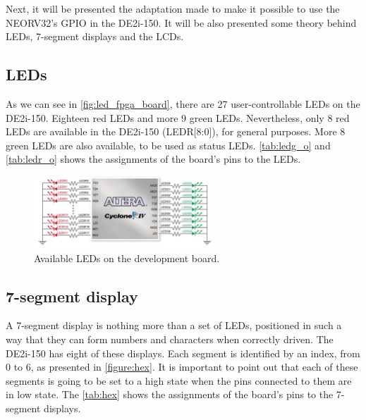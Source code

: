         Next, it will be presented the adaptation made to make it possible to use the NEORV32's GPIO in the DE2i-150. It will be also presented some theory behind LEDs, 7-segment displays and the LCDs.
        
        \subsection{LEDs}
            As we can see in \autoref{fig:led_fpga_board}, there are 27 user-controllable LEDs on the DE2i-150. Eighteen red LEDs and more 9 green LEDs. Nevertheless, only 8 red LEDs are available in the DE2i-150 (LEDR[8:0]), for general purposes. More 8 green LEDs are also available, to be used as status LEDs. \autoref{tab:ledg_o} and \autoref{tab:ledr_o} shows the assignments of the board's pins to the LEDs. 

            \begin{figure}[!ht]
                \begin{center}
                    \includegraphics[width= 0.6\textwidth]{figures/led_fpga_board.png}
                    \caption{\label{fig:led_fpga_board} Available LEDs on the development board.}
                \end{center}
            \end{figure}
            
        \subsection{7-segment display}
           A 7-segment display is nothing more than a set of LEDs, positioned in such a way that they can form numbers and characters when correctly driven. The DE2i-150 has eight of these displays. Each segment is identified by an index, from 0 to 6, as presented in \autoref{figure:hex}. It is important to point out that each of these segments is going to be set to a high state when the pins connected to them are in low state. The \autoref{tab:hex} shows the assignments of the board's pins to the 7-segment displays.
            
